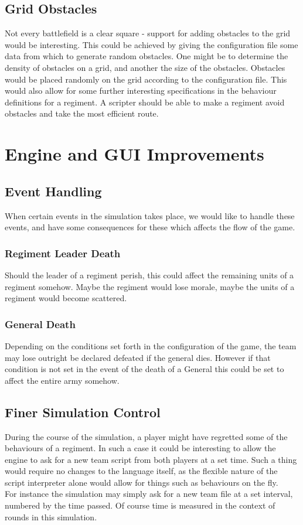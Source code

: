 \subsection{Grid Obstacles}
Not every battlefield is a clear square - support for adding obstacles to the grid would be interesting. This could be achieved by giving the configuration file some data from which to generate random obstacles. One might be to determine the density of obstacles on a grid, and another the size of the obstacles. Obstacles would be placed randomly on the grid according to the configuration file. This would also allow for some further interesting specifications in the behaviour definitions for a regiment. A scripter should be able to make a regiment avoid obstacles and take the most efficient route.
\section{Engine and GUI Improvements}
\subsection{Event Handling}
When certain events in the simulation takes place, we would like to handle these events, and have some consequences for these which affects the flow of the game.
\subsubsection*{Regiment Leader Death}
Should the leader of a regiment perish, this could affect the remaining units of a regiment somehow. Maybe the regiment would lose morale, maybe the units of a regiment would become scattered.
\subsubsection*{General Death}
Depending on the conditions set forth in the configuration of the game, the team may lose outright be declared defeated if the general dies. However if that condition is not set in the event of the death of a General this could be set to affect the entire army somehow. 
\subsection{Finer Simulation Control}
During the course of the simulation, a player might have regretted some of the behaviours of a regiment. In such a case it could be interesting to allow the engine to ask for a new team script from both players at a set time. Such a thing would require no changes to the language itself, as the flexible nature of the script interpreter alone would allow for things such as behaviours on the fly. \\
For instance the simulation may simply ask for a new team file at a set interval, numbered by the time passed. Of course time is measured in the context of rounds in this simulation.
